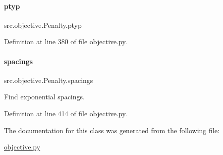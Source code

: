 \paragraph{\texorpdfstring{ptyp}{ptyp}}
{\footnotesize\ttfamily src.\+objective.\+Penalty.\+ptyp}



Definition at line 380 of file objective.\+py.

\mbox{\label{classsrc_1_1objective_1_1Penalty_a54f8696cb98aabcd6da11025b1f954a5}} 
\paragraph{\texorpdfstring{spacings}{spacings}}
{\footnotesize\ttfamily src.\+objective.\+Penalty.\+spacings}



Find exponential spacings. 



Definition at line 414 of file objective.\+py.



The documentation for this class was generated from the following file\+:\begin{DoxyCompactItemize}
\item 
\hyperlink{objective_8py}{objective.\+py}\end{DoxyCompactItemize}
